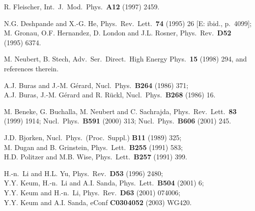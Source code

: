 \documentclass[11pt]{cernrep}
\begin{document}
\begin{thebibliography}{999}
R. Fleischer,
{ Int.\ J.\ Mod.\ Phys.}~{\bf A12} (1997) 2459.

N.G. Deshpande and X.-G. He,
{ Phys.\ Rev.\ Lett.}~{\bf 74} (1995) 26 [E: ibid., p.\ 4099];\\
M. Gronau, O.F. Hernandez, D. London and J.L. Rosner,
{ Phys.\ Rev.}~{\bf D52} (1995) 6374.

M. Neubert, B. Stech,
{ Adv.\ Ser.\ Direct.\ High Energy Phys.}~{\bf 15} (1998) 294,
and references therein.

A.J. Buras and J.-M. G\'erard,
{ Nucl.\ Phys.}~{\bf B264} (1986) 371;\\
A.J. Buras, J.-M. G\'erard and R. R\"uckl,
{ Nucl.\ Phys.}~{\bf B268} (1986) 16.

M. Beneke, G. Buchalla, M. Neubert and
C. Sachrajda,
{ Phys.\ Rev.\ Lett.}~{\bf 83} (1999) 1914;
{ Nucl.\ Phys.}~{\bf B591} (2000) 313;
{Nucl.\ Phys.}~{\bf B606} (2001) 245.

J.D. Bjorken, { Nucl.\ Phys.\ (Proc.\ Suppl.)}
{\bf B11} (1989) 325;\\
M. Dugan and B. Grinstein, { Phys.\ Lett.}~{\bf B255} (1991) 583;\\
H.D. Politzer and M.B. Wise, { Phys.\ Lett.}~{\bf B257} (1991) 399.

H.-n.\ Li and H.L. Yu,
{ Phys.\ Rev.}~{\bf D53} (1996) 2480;\\
Y.Y. Keum, H.-n.\ Li and A.I. Sanda,
{ Phys.\ Lett.}~{\bf B504} (2001) 6;\\
Y.Y. Keum and H.-n.\ Li,
{ Phys.\ Rev.}~{\bf D63} (2001) 074006;\\
Y.Y. Keum and A.I. Sanda,
eConf {\bf C0304052} (2003) WG420.%


\end{thebibliography}
\end{document}
